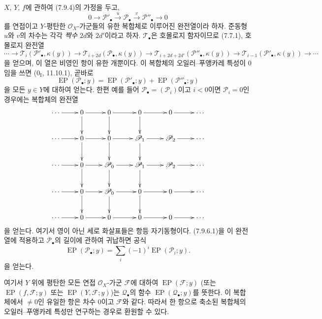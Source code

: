 \begin{env}[7.9.6]
\label{III.7.9.6.fr}
$X$, $Y$, $f$에 관하여 (7.9.4)의 가정을 두고,
\[
  0\longrightarrow\mathscr P'_\bullet
  \xrightarrow{u}\mathscr P_\bullet
  \xrightarrow{v}\mathscr P''_\bullet
  \longrightarrow0
\]
를 연접이고 $Y$-평탄한 $\mathscr O_X$-가군들의 유한 복합체로 이루어진
완전열이라 하자. 준동형 $u$와 $v$의 차수는 각각 \emph{짝수} $2d$와
$2d'$이라고 하자. $\mathscr T_\bullet$은 호몰로지 함자이므로 (7.7.1),
호몰로지 완전열
\[
  \cdots\longrightarrow
  \mathscr T_i(\mathscr P'_\bullet,\kappa(y))
  \longrightarrow
  \mathscr T_{i+2d}(\mathscr P_\bullet,\kappa(y))
  \longrightarrow
  \mathscr T_{i+2d+2d'}(\mathscr P''_\bullet,\kappa(y))
  \longrightarrow
  \mathscr T_{i-1}(\mathscr P'_\bullet,\kappa(y))
  \longrightarrow\cdots
\]
을 얻으며, 이 열은 비영인 항이 유한 개뿐이다. 이 복합체의
오일러--푸앵카레 특성이 0임을 쓰면 ($0_{\mathrm I}$, 11.10.1), 곧바로
\[
  \operatorname{EP}(\mathscr P_\bullet;y)
  =\operatorname{EP}(\mathscr P'_\bullet;y)
  +\operatorname{EP}(\mathscr P''_\bullet;y)
  \tag{7.9.6.1}\label{III.7.9.6.1.fr}
\]
을 모든 $y\in Y$에 대하여 얻는다. 한편 예를 들어
$\mathscr P_\bullet=(\mathscr P_i)$이고 $i<0$이면 $\mathscr P_i=0$인
경우에는 복합체의 완전열
\[
\xymatrix@C=2.4em{
  \cdots \ar[r] & 0 \ar[r]\ar[d] & 0 \ar[r]\ar[d]
    & 0 \ar[r]\ar[d] & 0 \ar[r] & \cdots \\
  \cdots \ar[r] & 0 \ar[r]\ar[d] & 0 \ar[r]\ar[d]
    & \mathscr P_1 \ar[r]\ar[d] & \mathscr P_2 \ar[r] & \cdots \\
  \cdots \ar[r] & 0 \ar[r]\ar[d] & \mathscr P_0 \ar[r]\ar[d]
    & \mathscr P_1 \ar[r]\ar[d] & \mathscr P_2 \ar[r] & \cdots \\
  \cdots \ar[r] & 0 \ar[r]\ar[d] & \mathscr P_0 \ar[r]\ar[d]
    & 0 \ar[r]\ar[d] & 0 \ar[r] & \cdots \\
  \cdots \ar[r] & 0 \ar[r] & 0 \ar[r]
    & 0 \ar[r] & 0 \ar[r] & \cdots
}
\]
을 얻는다. 여기서 영이 아닌 세로 화살표들은 항등 자기동형이다.
(7.9.6.1)을 이 완전열에 적용하고 $\mathscr P_\bullet$의 길이에 관하여
귀납하면 공식
\[
  \operatorname{EP}(\mathscr P_\bullet;y)
  =\sum_i(-1)^i\operatorname{EP}(\mathscr P_i;y).
  \tag{7.9.6.2}\label{III.7.9.6.2.fr}
\]
을 얻는다.

여기서 $Y$ 위에 평탄한 모든 연접 $\mathscr O_X$-가군 $\mathscr F$에
대하여 $\operatorname{EP}(\mathscr F;y)$ (또는
$\operatorname{EP}(f,\mathscr F;y)$ 또는
$\operatorname{EP}(Y,\mathscr F;y)$)는 $\mathscr Q_\bullet$의 함수
$\operatorname{EP}(\mathscr Q_\bullet;y)$를 뜻한다. 이 복합체에서
$\ne0$인 유일한 항은 차수 $0$이고 $\mathscr F$와 같다. 따라서 한
항으로 축소된 복합체의 오일러--푸앵카레 특성만 연구하는 경우로
환원할 수 있다.
\end{env}

